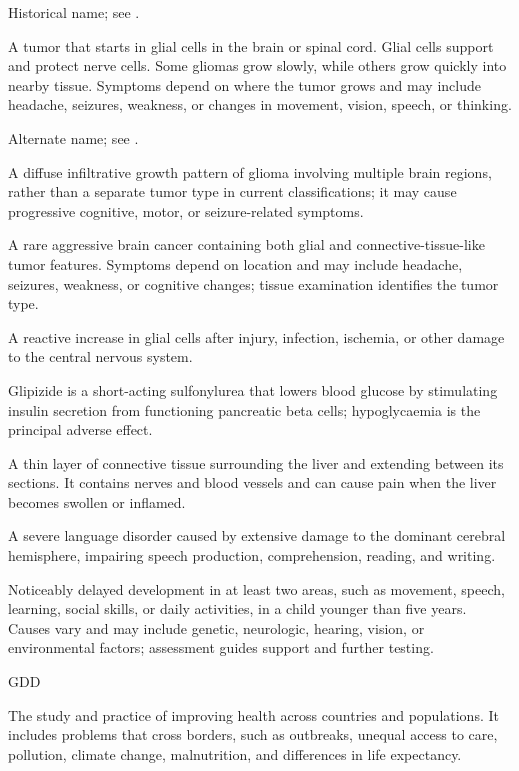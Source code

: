  Historical name; see .

 A tumor that starts in glial cells in the brain or spinal cord. Glial cells support and protect nerve cells. Some gliomas grow slowly, while others grow quickly into nearby tissue. Symptoms depend on where the tumor grows and may include headache, seizures, weakness, or changes in movement, vision, speech, or thinking.

 Alternate name; see .

 A diffuse infiltrative growth pattern of glioma involving multiple brain regions, rather than a separate tumor type in current classifications; it may cause progressive cognitive, motor, or seizure-related symptoms.

 A rare aggressive brain cancer containing both glial and connective-tissue-like tumor features. Symptoms depend on location and may include headache, seizures, weakness, or cognitive changes; tissue examination identifies the tumor type.

 A reactive increase in glial cells after injury, infection, ischemia, or other damage to the central nervous system.

 Glipizide is a short-acting sulfonylurea that lowers blood glucose by stimulating insulin secretion from functioning pancreatic beta cells; hypoglycaemia is the principal adverse effect.

 A thin layer of connective tissue surrounding the liver and extending between its sections. It contains nerves and blood vessels and can cause pain when the liver becomes swollen or inflamed.

 A severe language disorder caused by extensive damage to the dominant cerebral hemisphere, impairing speech production, comprehension, reading, and writing.

 Noticeably delayed development in at least two areas, such as movement, speech, learning, social skills, or daily activities, in a child younger than five years. Causes vary and may include genetic, neurologic, hearing, vision, or environmental factors; assessment guides support and further testing.

\synonyms
GDD

 The study and practice of improving health across countries and populations. It includes problems that cross borders, such as outbreaks, unequal access to care, pollution, climate change, malnutrition, and differences in life expectancy.


